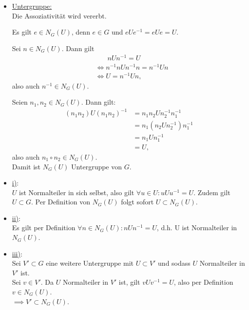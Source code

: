 \documentclass[a4paper]{article}
\begin{document}
    \begin{beweis}
        \begin{itemize} 
            \item \underline{Untergruppe:} \\
        Die Assoziativität wird vererbt.

        Es gilt $e \in N_G(U)$, denn $e \in G$ und $e U e^{-1} = e U e = U$.

        Sei $n \in N_G(U)$. Dann gilt
        \begin{align*}
            &\phantom{\iff}\ n U n^{-1} = U \\
            &\iff n^{-1} n U n^{-1} n = n ^{-1} U n \\
            &\iff U = n^{-1} U n
        ,\end{align*}
        also auch $n^{-1} \in N_G(U)$.

        Seien $n_1, n_2 \in N_G(U)$. Dann gilt:
        \begin{align*}
            (n_1 n_2) U (n_1 n_2)^{-1} &= n_1 n_2 U n_2^{-1} n_1^{-1} \\
                                       &= n_1 (n_2 U n_2^{-1}) n_1^{-1} \\
                                       &= n_1 U n_1^{-1} \\
                                       &= U
        ,\end{align*}
        also auch $n_1 \circ n_2 \in N_G(U)$. \\

        Damit ist $N_G(U)$ Untergruppe von $G$. \\
    \item \underline{i)}: \\
        $U$ ist Normalteiler in sich selbst, also gilt $\forall u \in U: u U u^{-1} = U$. Zudem gilt $U \subset G$. Per Definition von $N_G(U)$ folgt sofort $U \subset N_G(U)$. \\
    \item \underline{ii)}: \\
        Es gilt per Definition $\forall n \in N_G(U): n U n^{-1} = U$, d.h. U ist Normalteiler in $N_G(U)$. \\
    \item \underline{iii)}: \\
        Sei $V' \subset G$ eine weitere Untergruppe mit $U \subset  V'$ und sodass $U$ Normalteiler in $V'$ ist. \\
        Sei $v \in V'$. Da $U$ Normalteiler in $V'$ ist, gilt $v U v^{-1} = U$, also per Definition $v \in N_G(U)$. \\
        $\implies V' \subset N_G(U)$.
    \end{itemize}
    \end{beweis}
\end{document}
